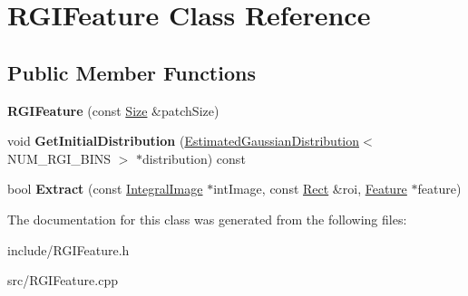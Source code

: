 \hypertarget{classRGIFeature}{}\section{R\+G\+I\+Feature Class Reference}
\label{classRGIFeature}
\subsection*{Public Member Functions}
\begin{DoxyCompactItemize}
\item 
\hypertarget{classRGIFeature_ad6aae4be82bd6f86d21675453983ff7d}{}{\bfseries R\+G\+I\+Feature} (const \hyperlink{classSize}{Size} \&patch\+Size)\label{classRGIFeature_ad6aae4be82bd6f86d21675453983ff7d}

\item 
\hypertarget{classRGIFeature_a82a0aa084cb027d6ea68a90460a633b7}{}void {\bfseries Get\+Initial\+Distribution} (\hyperlink{classEstimatedGaussianDistribution}{Estimated\+Gaussian\+Distribution}$<$ N\+U\+M\+\_\+\+R\+G\+I\+\_\+\+B\+I\+N\+S $>$ $\ast$distribution) const \label{classRGIFeature_a82a0aa084cb027d6ea68a90460a633b7}

\item 
\hypertarget{classRGIFeature_a603a11aa48dd81f4c7f867662587b30c}{}bool {\bfseries Extract} (const \hyperlink{classIntegralImage}{Integral\+Image} $\ast$int\+Image, const \hyperlink{classRect}{Rect} \&roi, \hyperlink{classFeature}{Feature} $\ast$feature)\label{classRGIFeature_a603a11aa48dd81f4c7f867662587b30c}

\end{DoxyCompactItemize}


The documentation for this class was generated from the following files\+:\begin{DoxyCompactItemize}
\item 
include/R\+G\+I\+Feature.\+h\item 
src/R\+G\+I\+Feature.\+cpp\end{DoxyCompactItemize}
